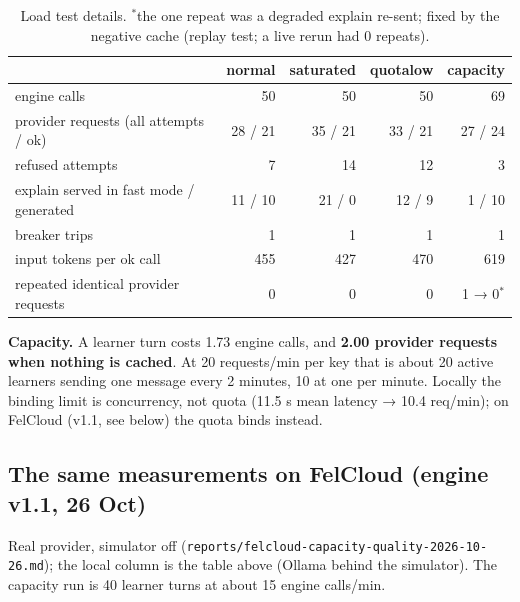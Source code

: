 \documentclass[11pt,a4paper]{article}
\renewcommand{\_}{\origus\allowbreak}
\begin{document}
\begin{table}[H]
\centering\small
\begin{tabular}{@{}l r r r r@{}}
\toprule
& \textbf{normal} & \textbf{saturated} & \textbf{quota\_low} & \textbf{capacity}\\
\midrule
engine calls & 50 & 50 & 50 & 69\\
provider requests (all attempts / ok) & 28 / 21 & 35 / 21 & 33 / 21 & 27 / 24\\
refused attempts & 7 & 14 & 12 & 3\\
explain served in fast mode / generated & 11 / 10 & 21 / 0 & 12 / 9 & 1 / 10\\
breaker trips & 1 & 1 & 1 & 1\\
input tokens per ok call & 455 & 427 & 470 & 619\\
repeated identical provider requests & 0 & 0 & 0 & 1 → 0$^*$\\
\bottomrule
\end{tabular}
\caption{Load test details. $^*$the one repeat was a degraded explain re-sent; fixed by the negative cache (replay test; a live rerun had 0 repeats).}
\end{table}

\textbf{Capacity.} A learner turn costs 1.73 engine calls, and \textbf{2.00 provider requests when nothing
is cached}. At 20 requests/min per key that is about 20 active learners sending one message every 2
minutes, 10 at one per minute. Locally the binding limit is concurrency, not quota (11.5 s mean latency
→ 10.4 req/min); on FelCloud (v1.1, see below) the quota binds instead.

\subsection{The same measurements on FelCloud (engine v1.1, 26 Oct)}

Real provider, simulator off (\texttt{reports/felcloud-capacity-quality-2026-10-26.md}); the local column is the table above (Ollama behind the simulator). The capacity run is 40 learner turns at about 15 engine calls/min.
\end{document}
